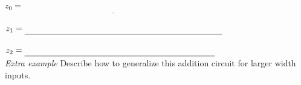 \documentclass[12pt, oneside]{article}
\begin{document}
$z_0 = \underline{\phantom{x_0 \oplus y_0}\hspace{3in}}$


$z_1 = \underline{ \phantom{(c_0 \oplus x_1) \oplus y_1}\hspace{2.4in}}$ \phantom{where $c_0 = x_0 \land y_0$}


$z_2 = \underline{\phantom{(c_0 \land x_1) \oplus ((c_0 \oplus x_1)\land y_1)}\hspace{1.5in}}$\\

{\it Extra example} Describe how to generalize this addition circuit for larger width inputs.
\end{document}
